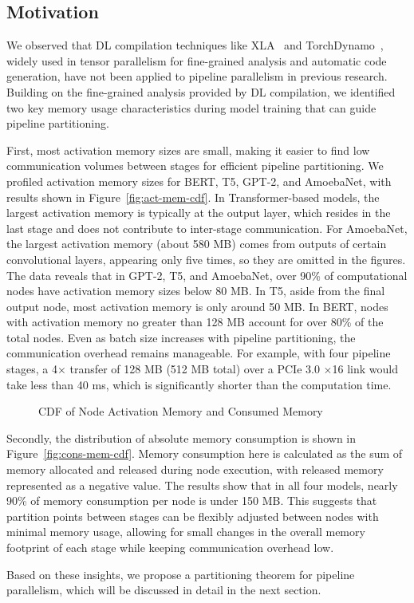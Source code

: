 \subsection{Motivation}
\label{sec:mot}
We observed that DL compilation techniques like XLA~\cite{sabneXlaCompilingMachine2020}
and TorchDynamo~\cite{anselPyTorchFasterMachine2024},
widely used in tensor parallelism for fine-grained analysis and automatic code generation,
have not been applied to pipeline parallelism in previous research.
Building on the fine-grained analysis provided by DL compilation,
we identified two key memory usage characteristics during model training that can guide pipeline partitioning.

First, most activation memory sizes are small,
making it easier to find low communication volumes between stages for efficient pipeline partitioning.
We profiled activation memory sizes for BERT, T5, GPT-2, and AmoebaNet, with results shown in Figure~\ref{fig:act-mem-cdf}.
In Transformer-based models, the largest activation memory is typically at the output layer,
which resides in the last stage and does not contribute to inter-stage communication.
For AmoebaNet, the largest activation memory (about 580 MB) comes from outputs of certain convolutional layers,
appearing only five times, so they are omitted in the figures. 
The data reveals that in GPT-2, T5, and AmoebaNet, over 90\% of computational nodes have activation memory sizes below 80 MB.
In T5, aside from the final output node, most activation memory is only around 50 MB.
In BERT, nodes with activation memory no greater than 128 MB account for over 80\% of the total nodes.
Even as batch size increases with pipeline partitioning, the communication overhead remains manageable.
For example, with four pipeline stages, a 4$\times$ transfer of 128 MB (512 MB total) over
a PCIe 3.0 $\times$16 link would take less than 40 ms, which is significantly shorter than the computation time.
\begin{figure}[htb]
  \centering
  \caption{CDF of Node Activation Memory and Consumed Memory}
  \label{fig:mem-cdf}
\end{figure}

Secondly, the distribution of absolute memory consumption is shown in Figure~\ref{fig:cons-mem-cdf}.
Memory consumption here is calculated as the sum of memory allocated and released during node execution,
with released memory represented as a negative value.
The results show that in all four models, nearly 90\% of memory consumption per node is under 150 MB.
This suggests that partition points between stages can be flexibly adjusted between nodes with minimal memory usage,
allowing for small changes in the overall memory footprint of each stage while keeping communication overhead low.

Based on these insights, we propose a partitioning theorem for pipeline parallelism,
which will be discussed in detail in the next section.